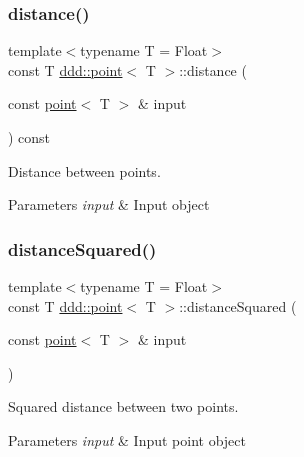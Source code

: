 \subsubsection{\texorpdfstring{distance()}{distance()}}
{\footnotesize\ttfamily template$<$typename T = Float$>$ \\
const T \hyperlink{classddd_1_1point}{ddd\+::point}$<$ T $>$\+::distance (\begin{DoxyParamCaption}\item[{const \hyperlink{classddd_1_1point}{point}$<$ T $>$ \&}]{input }\end{DoxyParamCaption}) const\hspace{0.3cm}{\ttfamily [inline]}}



Distance between points. 


\begin{DoxyParams}{Parameters}
{\em input} & Input object \\
\hline
\end{DoxyParams}
\mbox{\label{classddd_1_1point_a4b6793fd154fc9ad4dd93a4927d4ee13}} 
\subsubsection{\texorpdfstring{distance\+Squared()}{distanceSquared()}}
{\footnotesize\ttfamily template$<$typename T = Float$>$ \\
const T \hyperlink{classddd_1_1point}{ddd\+::point}$<$ T $>$\+::distance\+Squared (\begin{DoxyParamCaption}\item[{const \hyperlink{classddd_1_1point}{point}$<$ T $>$ \&}]{input }\end{DoxyParamCaption})\hspace{0.3cm}{\ttfamily [inline]}}



Squared distance between two points. 


\begin{DoxyParams}{Parameters}
{\em input} & Input point object \\
\hline
\end{DoxyParams}
\mbox{\label{classddd_1_1point_aa4cdbbf16736ee09e840e33f77e94b8a}} 
